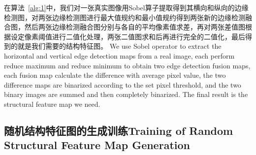 \documentclass[letterpaper]{article} %
\begin{document}
在算法~\ref{alg:1}中，我们对一张真实图像用Sobel算子提取得到其横向和纵向的边缘检测图，对两张边缘检测图进行最大值规约和最小值规约得到两张新的边缘检测融合图，然后两张边缘检测融合图分别与各自的平均像素值求差，再对两张差值图根据设定像素阈值进行二值化处理，两张二值图求和后再进行完全的二值化，最后得到的就是我们需要的结构特征图。
We use Sobel operator to extract the horizontal and vertical edge detection maps from a real image, each perform reduce maximum and reduce minimum to obtain two edge detection fusion maps, each fusion map calculate the difference with average pixel value, the two difference maps are binarized according to the set pixel threshold, and the two binary images are summed and then completely binarized. The final result is the structural feature map we need.

\subsection{随机结构特征图的生成训练Training of Random Structural Feature Map Generation}
\end{document}
